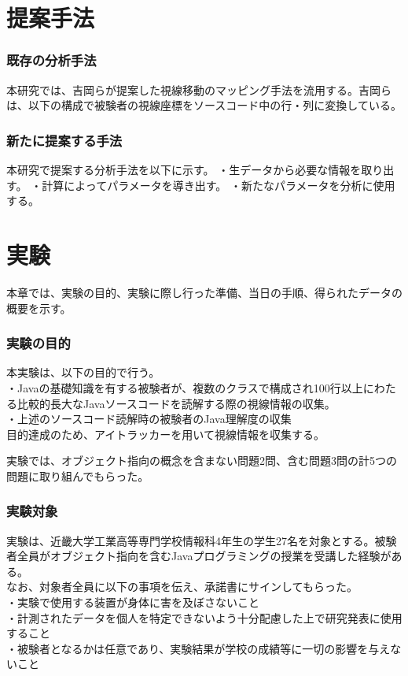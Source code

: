 \documentclass[paper=a4paper,fontsize=11pt]{jlreq}
\begin{document}
\clearpage

\part{提案手法}
  \section{既存の分析手法}
  本研究では、吉岡らが提案した視線移動のマッピング手法\cite{meiji}を流用する。吉岡らは、以下の構成で被験者の視線座標をソースコード中の行・列に変換している。\\
  

  \section{新たに提案する手法}
  本研究で提案する分析手法を以下に示す。
  ・生データから必要な情報を取り出す。
  ・計算によってパラメータを導き出す。
  ・新たなパラメータを分析に使用する。

\clearpage

\part{実験}
  本章では、実験の目的、実験に際し行った準備、当日の手順、得られたデータの概要を示す。\\

  \section{実験の目的}
  本実験は、以下の目的で行う。\\
  ・Javaの基礎知識を有する被験者が、複数のクラスで構成され100行以上にわたる比較的長大なJavaソースコードを読解する際の視線情報の収集。\\
  ・上述のソースコード読解時の被験者のJava理解度の収集\\

  目的達成のため、アイトラッカーを用いて視線情報を収集する。

  実験では、オブジェクト指向の概念を含まない問題2問、含む問題3問の計5つの問題に取り組んでもらった。

  \section{実験対象}
  実験は、近畿大学工業高等専門学校情報科4年生の学生27名を対象とする。被験者全員がオブジェクト指向を含むJavaプログラミングの授業を受講した経験がある。\\
  なお、対象者全員に以下の事項を伝え、承諾書にサインしてもらった。\\
  ・実験で使用する装置が身体に害を及ぼさないこと\\
  ・計測されたデータを個人を特定できないよう十分配慮した上で研究発表に使用すること\\
  ・被験者となるかは任意であり、実験結果が学校の成績等に一切の影響を与えないこと\\
  \\
  
\end{document}
